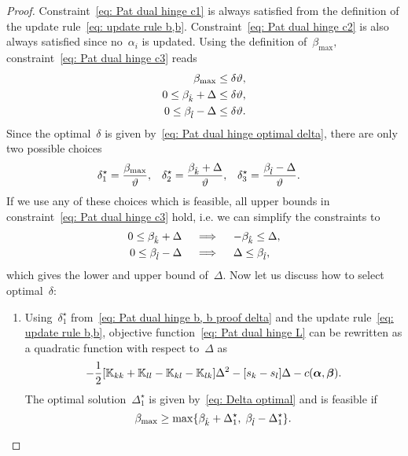 \begin{proof}
  Constraint~\eqref{eq: Pat dual hinge c1} is always satisfied from the definition of the update rule~\eqref{eq: update rule b,b}. Constraint~\eqref{eq: Pat dual hinge c2} is also always satisfied since no~$\alpha_i$ is updated. Using the definition of~$\beta_{\max},$ constraint~\eqref{eq: Pat dual hinge c3} reads
  \begin{align*}
    \beta_{\max} & \leq \delta \vartheta, \\
    0 \leq \beta_{\hat{k}} + \Delta & \leq \delta \vartheta, \\
    0 \leq \beta_{\hat{l}} - \Delta & \leq \delta \vartheta.
  \end{align*}
  Since the optimal~$\delta$ is given by~\eqref{eq: Pat dual hinge optimal delta}, there are only two possible choices
  \begin{align}\label{eq: Pat dual hinge b, b proof delta}
    \delta^{\star}_1 & = \frac{\beta_{\max}}{\vartheta}, &
    \delta^{\star}_2 & = \frac{\beta_{\hat{k}} + \Delta}{\vartheta}, &
    \delta^{\star}_3 & = \frac{\beta_{\hat{l}} - \Delta}{\vartheta}.
  \end{align}
  If we use any of these choices which is feasible, all upper bounds in constraint~\eqref{eq: Pat dual hinge c3} hold, i.e. we can simplify the constraints to
  \begin{align*}
    0 \leq \beta_{\hat{k}} + \Delta
    & \quad \implies \quad
    - \beta_{\hat{k}} \leq \Delta, \\
    0 \leq \beta_{\hat{l}} - \Delta
    & \quad \implies \quad
    \Delta \leq \beta_{\hat{l}},
  \end{align*}
  which gives the lower and upper bound of~$\Delta.$ Now let us discuss how to select optimal~$\delta:$
  \begin{enumerate}
    \item Using~$\delta^{\star}_1$ from~\eqref{eq: Pat dual hinge b, b proof delta} and the update rule~\eqref{eq: update rule b,b}, objective function~\eqref{eq: Pat dual hinge L} can be rewritten as a quadratic function with respect to~$\Delta$ as
    \begin{equation*}
      - \frac{1}{2} \Brac[s]{\K_{kk} + \K_{ll} - \K_{kl} - \K_{lk}} \Delta^2
      - \Brac[s]{s_k - s_l} \Delta
      - c(\bm{\alpha}, \bm{\beta}).
    \end{equation*}
    The optimal solution~$\Delta^{\star}_1$ is given by~\eqref{eq: Delta optimal} and is feasible if
    \begin{equation*}
      \beta_{\max} \geq \max\{\beta_{\hat{k}} + \Delta^{\star}_1, \; \beta_{\hat{l}} - \Delta^{\star}_1\}.
    \end{equation*}


\end{enumerate}
\end{proof}
